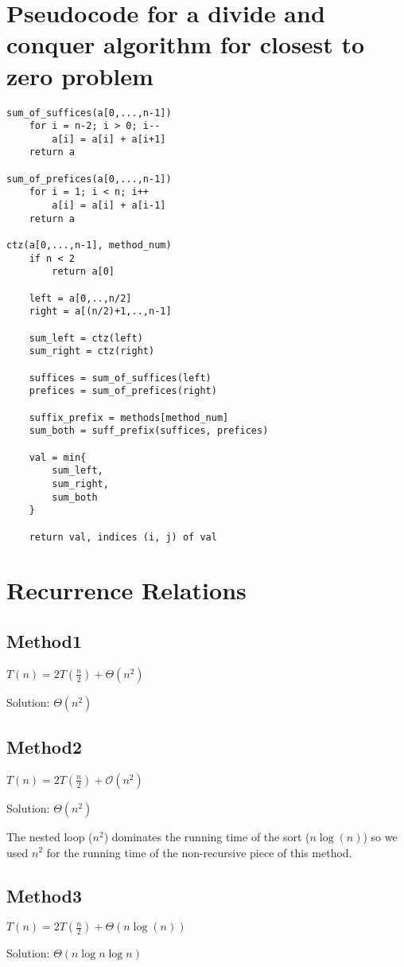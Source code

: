 \documentclass{article}
\begin{document}
\section{Pseudocode for a divide and conquer algorithm for closest to zero problem}
\begin{verbatim}
sum_of_suffices(a[0,...,n-1])
    for i = n-2; i > 0; i--
        a[i] = a[i] + a[i+1]
    return a

sum_of_prefices(a[0,...,n-1])
    for i = 1; i < n; i++
        a[i] = a[i] + a[i-1]
    return a

ctz(a[0,...,n-1], method_num)
    if n < 2
        return a[0]

    left = a[0,..,n/2]
    right = a[(n/2)+1,..,n-1]

    sum_left = ctz(left)
    sum_right = ctz(right)

    suffices = sum_of_suffices(left)
    prefices = sum_of_prefices(right)

    suffix_prefix = methods[method_num]
    sum_both = suff_prefix(suffices, prefices)

    val = min{
        sum_left,
        sum_right,
        sum_both
    }

    return val, indices (i, j) of val

\end{verbatim}

\section{Recurrence Relations}

\subsection*{Method1}
$T(n) = 2T(\frac{n}{2}) + \Theta(n^2)$

Solution: $\Theta(n^2)$

\subsection*{Method2}
$T(n) = 2T(\frac{n}{2}) + \mathcal{O}(n^2)$

Solution: $\Theta(n^2)$

The nested loop ($n^2$) dominates the running time of the sort ($n \log(n)$) so
we used $n^2$ for the running time of the non-recursive piece of this method.

\subsection*{Method3}
$T(n) = 2T(\frac{n}{2}) + \Theta(n \log(n))$

Solution: $\Theta(n \log n \log n)$
\end{document}

